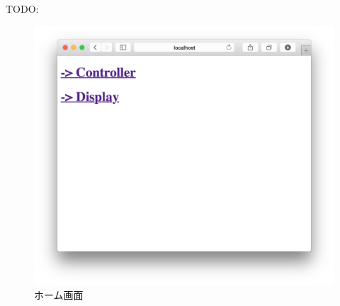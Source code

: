 \documentclass[a4paper,10pt,oneside]{jsbook}
\begin{document}
TODO:

\begin{figure}[htbp]
	\begin{center}
		\includegraphics[width=11.5cm]{image/home.png}
	\end{center}
	\caption{ホーム画面}
	\label{fig:home}
\end{figure}
\end{document}
